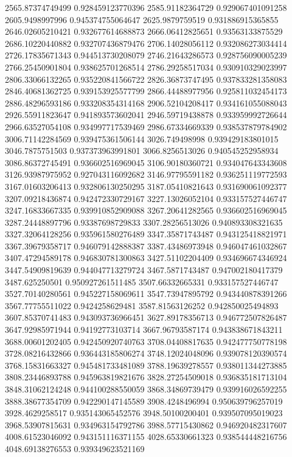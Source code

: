 {2565.87374749499 0.928459123770396
2585.91182364729 0.929067401091258
2605.9498997996 0.945374755064647
2625.9879759519 0.931886915365855
2646.02605210421 0.932677614688873
2666.06412825651 0.93563133875529
2686.10220440882 0.932707436879476
2706.14028056112 0.932086273034414
2726.17835671343 0.944513730208079
2746.21643286573 0.928756090005239
2766.25450901804 0.938625701268514
2786.29258517034 0.930910329023997
2806.33066132265 0.935220841566722
2826.36873747495 0.937833281358083
2846.40681362725 0.939153925577799
2866.44488977956 0.925811032454173
2886.48296593186 0.933208354314168
2906.52104208417 0.934161055088043
2926.55911823647 0.941893573602041
2946.59719438878 0.933959992726644
2966.63527054108 0.934997717539469
2986.67334669339 0.938537879784902
3006.71142284569 0.939475361506144
3026.749498998 0.939429183801015
3046.7875751503 0.937373963991801
3066.8256513026 0.940545252958934
3086.86372745491 0.936602516969045
3106.90180360721 0.934047643343608
3126.93987975952 0.927043116092682
3146.97795591182 0.936251119772593
3167.01603206413 0.932806130250295
3187.05410821643 0.931690061092377
3207.09218436874 0.942472330729167
3227.13026052104 0.933157527446747
3247.16833667335 0.939910852909088
3267.20641282565 0.936602516969045
3287.24448897796 0.93387698729833
3307.28256513026 0.940893308321635
3327.32064128256 0.935961580276489
3347.35871743487 0.943125418821971
3367.39679358717 0.946079142888387
3387.43486973948 0.946047461032867
3407.47294589178 0.946830781300863
3427.51102204409 0.934696674346924
3447.54909819639 0.944047713279724
3467.5871743487 0.947002180417379
3487.625250501 0.950927261511485
3507.66332665331 0.933157527446747
3527.70140280561 0.945227158069611
3547.73947895792 0.943440878391266
3567.77755511022 0.9424258629481
3587.81563126252 0.942850025494893
3607.85370741483 0.943093736966451
3627.89178356713 0.946772507826487
3647.92985971944 0.94192773103714
3667.96793587174 0.943838671843211
3688.00601202405 0.942450920740763
3708.04408817635 0.942477750778198
3728.08216432866 0.936443185806274
3748.12024048096 0.939078120390574
3768.15831663327 0.945481733481089
3788.19639278557 0.938011344273885
3808.23446893788 0.945963819821676
3828.27254509018 0.936835181713104
3848.31062124248 0.944100288550059
3868.34869739479 0.939916026592255
3888.38677354709 0.942290147145589
3908.4248496994 0.950639796257019
3928.4629258517 0.935143065452576
3948.50100200401 0.939507095019023
3968.53907815631 0.934963154792786
3988.57715430862 0.946920482317607
4008.61523046092 0.943151116371155
4028.65330661323 0.938544448216756
4048.69138276553 0.939349623521169
}
